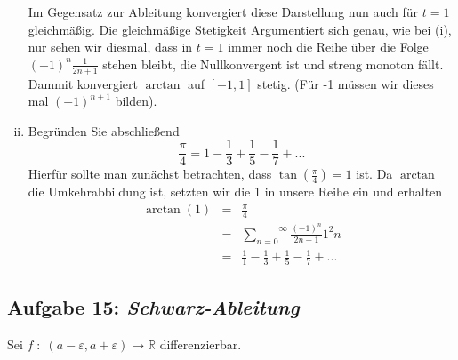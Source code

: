 \documentclass[11pt,a4paper,ngerman]{article}
\begin{document}
\begin{enumerate}[(i)]
        Im Gegensatz zur Ableitung konvergiert diese Darstellung nun auch für $t=1$ gleichmäßig.
        Die gleichmäßige Stetigkeit Argumentiert sich genau, wie bei (i), nur sehen wir diesmal,
        dass in $t=1$ immer noch die Reihe über die Folge $(-1)^n \frac{1}{2n+1}$ stehen bleibt,
        die Nullkonvergent ist und streng monoton fällt. Dammit konvergiert $\arctan$ auf $[-1,1]$ stetig.
        (Für -1 müssen wir dieses mal $(-1)^{n+1}$ bilden).

    \item Begründen Sie abschließend
        $$
            \frac{\pi}{4} = 1 - \frac{1}{3} + \frac{1}{5} - \frac{1}{7} + ...
        $$
        Hierfür sollte man zunächst betrachten, dass $\tan(\frac{\pi}{4}) = 1$ ist. Da $\arctan$ die
        Umkehrabbildung ist, setzten wir die 1 in unsere Reihe ein und erhalten
        $$\begin{array}{rcl}
            \arctan (1) &=& \frac{\pi}{4} \\
                &=& \overset{\infty}{\underset{n=0}{\sum}} \frac{(-1)^n}{2n+1}1^2n\\
                &=& \frac{1}{1} - \frac{1}{3} + \frac{1}{5} - \frac{1}{7} + ...
        \end{array}$$
\end{enumerate}

\subsection*{Aufgabe 15: \mdseries\itshape Schwarz-Ableitung}
Sei $f \; : \; (a - \varepsilon, a +\varepsilon) \longrightarrow \mathbb{R}$ differenzierbar.
\end{document}
